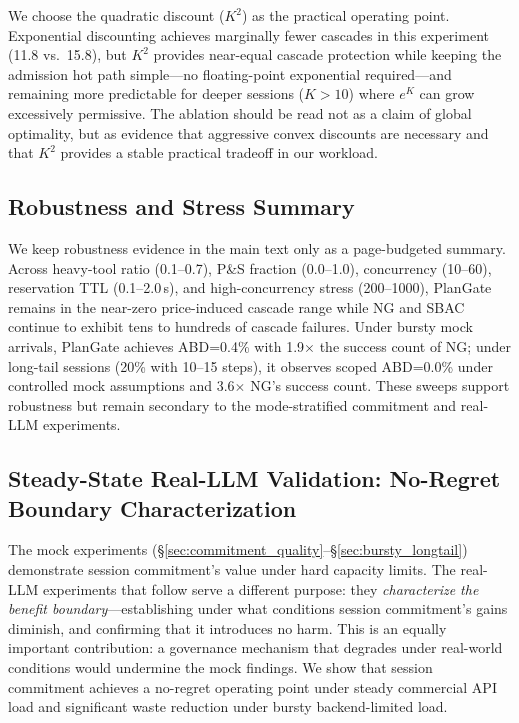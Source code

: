 \documentclass[sigconf,review,anonymous]{acmart}
\begin{document}
We choose the quadratic discount ($K^2$) as the practical operating point. Exponential discounting achieves marginally fewer cascades in this experiment (11.8 vs.\ 15.8), but $K^2$ provides near-equal cascade protection while keeping the admission hot path simple---no floating-point exponential required---and remaining more predictable for deeper sessions ($K{>}10$) where $e^K$ can grow excessively permissive. The ablation should be read not as a claim of global optimality, but as evidence that aggressive convex discounts are necessary and that $K^2$ provides a stable practical tradeoff in our workload. 
\subsection{Robustness and Stress Summary}
\label{sec:sensitivity_main}
\label{sec:sensitivity}
\label{sec:concsens}
\label{sec:scalestress}
\label{sec:bursty_longtail}

We keep robustness evidence in the main text only as a page-budgeted summary. Across heavy-tool ratio (0.1--0.7), P\&S fraction (0.0--1.0), concurrency (10--60), reservation TTL (0.1--2.0\,s), and high-concurrency stress (200--1000), PlanGate remains in the near-zero price-induced cascade range while NG and SBAC continue to exhibit tens to hundreds of cascade failures. Under bursty mock arrivals, PlanGate achieves ABD=0.4\% with 1.9$\times$ the success count of NG; under long-tail sessions (20\% with 10--15 steps), it observes scoped ABD=0.0\% under controlled mock assumptions and 3.6$\times$ NG's success count. These sweeps support robustness but remain secondary to the mode-stratified commitment and real-LLM experiments.

\subsection{Steady-State Real-LLM Validation: No-Regret Boundary Characterization}
\label{sec:reallm}

The mock experiments (\S\ref{sec:commitment_quality}--\S\ref{sec:bursty_longtail}) demonstrate session commitment's value under hard capacity limits. The real-LLM experiments that follow serve a different purpose: they \emph{characterize the benefit boundary}---establishing under what conditions session commitment's gains diminish, and confirming that it introduces no harm. This is an equally important contribution: a governance mechanism that degrades under real-world conditions would undermine the mock findings. We show that session commitment achieves a no-regret operating point under steady commercial API load and significant waste reduction under bursty backend-limited load.
\end{document}
